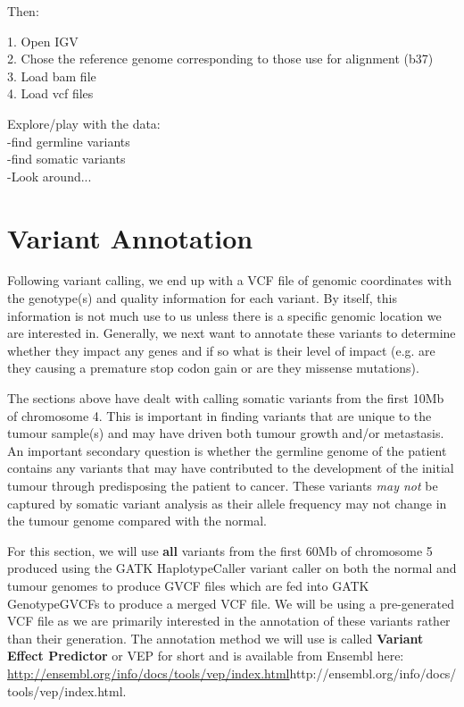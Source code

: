 Then:
 
   1. Open IGV \\
   2. Chose the reference genome corresponding to those use for alignment (b37) \\
   3. Load bam file \\
   4. Load vcf files

Explore/play with the data: \\ 
   -find germline variants \\
   -find somatic variants \\
   -Look around...

\newpage



\section{Variant Annotation}

Following variant calling, we end up with a VCF file of genomic coordinates with the genotype(s) and quality information for each variant. By itself, this information is not much use to us unless there is a specific genomic location we are interested in. Generally, we next want to annotate these variants to determine whether they impact any genes and if so what is their level of impact (e.g. are they causing a premature stop codon gain or are they missense mutations).

The sections above have dealt with calling somatic variants from the first 10Mb of chromosome 4. This is important in finding variants that are unique to the tumour sample(s) and may have driven both tumour growth and/or metastasis. An important secondary question is whether the germline genome of the patient contains any variants that may have contributed to the development of the initial tumour through predisposing the patient to cancer. These variants \textit{may not} be captured by somatic variant analysis as their allele frequency may not change in the tumour genome compared with the normal.

For this section, we will use \textbf{all} variants from the first 60Mb of chromosome 5 produced using the GATK HaplotypeCaller variant caller on both the normal and tumour genomes to produce GVCF files which are fed into GATK GenotypeGVCFs to produce a merged VCF file. We will be using a pre-generated VCF file as we are primarily interested in the annotation of these variants rather than their generation. The annotation method we will use is called \textbf{Variant Effect Predictor} or VEP for short and is available from Ensembl here: \url{http://ensembl.org/info/docs/tools/vep/index.html}{http://ensembl.org/info/docs/tools/vep/index.html}.

